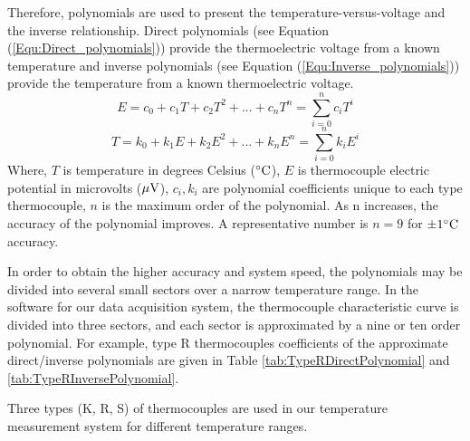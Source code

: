 Therefore, polynomials are used to present the temperature-versus-voltage and the inverse relationship.
Direct polynomials (see Equation (\ref{Equ:Direct_polynomials})) provide the thermoelectric voltage from a known temperature and inverse polynomials (see Equation (\ref{Equ:Inverse_polynomials})) provide the temperature from a known thermoelectric voltage.
\begin{equation}
\label{Equ:Direct_polynomials}
E = {c_0} + {c_1}T + {c_2}{T^2} + ... + {c_n}{T^n} = \sum\limits_{i = 0}^n {{c_i}{T^i}}
\end{equation}
\begin{equation}
\label{Equ:Inverse_polynomials}
T = {k_0} + {k_1}E + {k_2}{E^2} + ... + {k_n}{E^n} = \sum\limits_{i = 0}^n {{k_i}{E^i}}
\end{equation}
Where, $T$ is temperature in degrees Celsius ($^{\circ} \rm{C}$), $E$ is thermocouple electric potential in microvolts (${\rm{\mu V}}$), $c_i,k_i$ are polynomial coefficients unique to each type thermocouple, $n$ is the maximum order of the polynomial.
As n increases, the accuracy of the polynomial improves.
A representative number is $n = 9$ for $\pm 1 ^{\circ} \rm{C}$ accuracy.

In order to obtain the higher accuracy and system speed, the polynomials may be divided into several small sectors over a narrow temperature range.
In the software for our data acquisition system, the thermocouple characteristic curve is divided into three sectors, and each sector is approximated by a nine or ten order
polynomial.
For example, type R thermocouples coefficients of the approximate direct/inverse polynomials are given in Table \ref{tab:TypeRDirectPolynomial} and \ref{tab:TypeRInversePolynomial}.

Three types (K, R, S) of thermocouples are used in our temperature measurement system for different temperature ranges.



